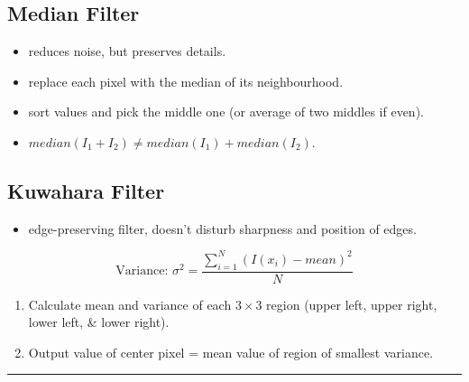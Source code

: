 \subsection{Median Filter}
\begin{itemize}
  \item reduces noise, but preserves details.
  \item replace each pixel with the median of its neighbourhood.
  \item sort values and pick the middle one (or average of two middles if even).
  \item $median(I_1+I_2)\neq median(I_1)+median(I_2)$.
\end{itemize}
\subsection{Kuwahara Filter}
\begin{itemize}
  \item edge-preserving filter, doesn't disturb sharpness and position of edges.
\end{itemize}
\[
    \text{Variance: }\sigma^2 = \frac{\sum_{i=1}^{N}{(I(x_i) - mean)^2}}{N}
\]
\begin{enumerate}
  \item Calculate mean and variance of each $3 \times 3$ region (upper left, upper right, lower left, \& lower right).
  \item Output value of center pixel = mean value of region of smallest variance.
\end{enumerate}
\hrule
